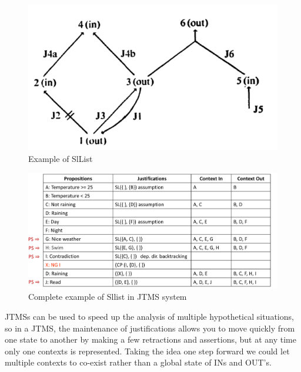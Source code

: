 \begin{figure}
	\includegraphics[width=\textwidth]{Images/slList}
	\caption{Example of SlList}
	\label{img:slList}
\end{figure}

\begin{figure}
	\includegraphics[width=\textwidth]{Images/exampleSlList}
	\caption{Complete example of Sllist in JTMS system}
	\label{img:exSlList}
\end{figure}

JTMSs can be used to speed up the analysis of multiple hypothetical situations, so
in a JTMS, the maintenance of justifications allows you to move quickly from one
state to another by making a few retractions and assertions, but at any time only
one contexts is represented.\newline
Taking the idea one step forward we could let multiple contexts to co-exist rather
than a global state of INs and OUT’s.

